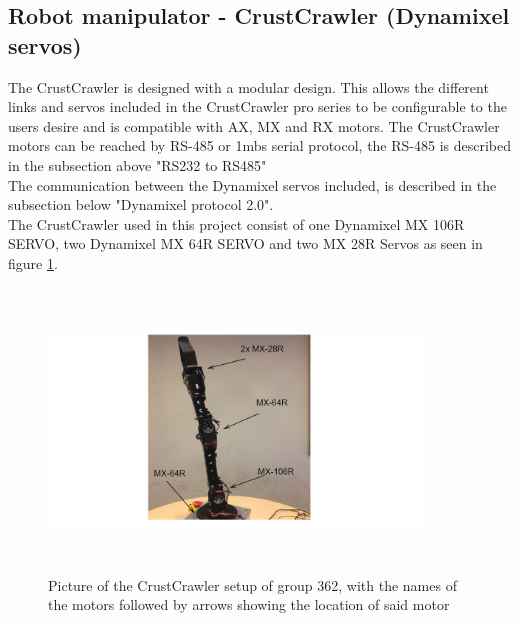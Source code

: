 \subsection*{Robot manipulator - CrustCrawler (Dynamixel servos)}\label{sec:DynProt}
The CrustCrawler is designed with a modular design. This allows the different links and servos included in the CrustCrawler pro series to be configurable to the users desire and is compatible with AX, MX and RX motors. The CrustCrawler motors can be reached by RS-485 or 1mbs serial protocol, the RS-485 is described in the subsection above "RS232 to RS485"\\
The communication between the Dynamixel servos included, is described in the subsection below "Dynamixel protocol 2.0".\\
The CrustCrawler used in this project consist of one Dynamixel MX 106R SERVO, two Dynamixel MX 64R SERVO and two MX 28R Servos as seen in figure \ref{fig:CrustCrawlerSetup}.
\begin{figure}[H]
 \centering 
    \includegraphics[width=10cm,height=7.5cm]{Figures/Technical_figures/diagram-20181210.png}
    \caption{Picture of the CrustCrawler setup of group 362, with the names of the motors followed by arrows showing the location of said motor}
    \label{fig:CrustCrawlerSetup}
\end{figure}
